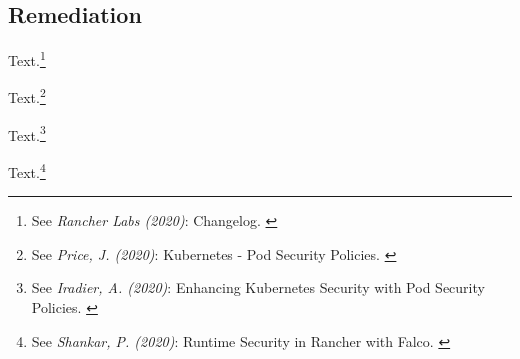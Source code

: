 \subsection{Remediation}

Text.\footnote{See \textit{Rancher Labs (2020)}: Changelog. \cite{ChangeLog}}

Text.\footnote{See \textit{Price, J. (2020)}: Kubernetes - Pod Security Policies. \cite{examplePsp}}

Text.\footnote{See \textit{Iradier, A. (2020)}: Enhancing Kubernetes Security with Pod Security Policies. \cite{detailPsp}}

Text.\footnote{See \textit{Shankar, P. (2020)}: Runtime Security in Rancher with Falco. \cite{falcoPsp}}
